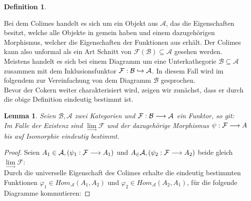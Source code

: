 \documentclass[10pt,a4paper]{report}
\newtheorem{lemma}[satz]{Lemma}
\newtheorem{definition}[satz]{Definition}
\newcommand{\functionfront}[3]{\nolinebreak{#1:#2 \longrightarrow #3}}
\newcommand{\colimes}[0]{\lim\limits_{ \longrightarrow }}
\newcommand{\infunctionfront}[3]{\nolinebreak{#1:#2 \hookrightarrow #3}}
\begin{document}
{\begin{definition}
\begin{itemize}
\end{itemize}
\end{definition}
Bei dem Colimes handelt es sich um ein Objekt aus $\mathcal{A}$, das die Eigenschaften besitzt, welche alle Objekte in  gemein haben und einem dazugehörigen Morphismus, welcher die Eigenschaften der Funktionen aus  erhält. Der Colimes kann also unformal als ein Art Schnitt von $\mathcal{F}(\mathcal{B}) \subseteq \mathcal{A}$ gesehen werden.\\
Meistens handelt es sich bei einem Diagramm um eine Unterkathegorie $\mathcal{B} \subseteq \mathcal{A}$ zusammen mit dem Inklusionsfunktor $\infunctionfront{\mathcal{F}}{\mathcal{B}}{\mathcal{A}}$. In diesem Fall wird im folgendem zur Vereinfachung von dem Diagramm $\mathcal{B}$ gesprochen.\\
Bevor der Cokern weiter charakterisiert wird, zeigen wir zunächst, dass er durch die obige Definition eindeutig bestimmt ist.
\begin{lemma}
Seien $\mathcal{B},\mathcal{A}$ zwei Kategorien und $\functionfront{\mathcal{F}}{\mathcal{B}}{\mathcal{A}}$ ein Funktor, so git:\\ 
Im Falle der Existenz sind $\colimes \mathcal{F}$ und der dazugehörige Morphismus $\functionfront{\psi}{\mathcal{F}}{A}$ bis auf Isomorphie eindeutig bestimmt.
\end{lemma}
\begin{proof}
Seien $A_1 \in \mathcal{A}, (\functionfront{\psi_1}{\mathcal{F}}{A_1}) $ und $A_ \in \mathcal{A} , (\functionfront{\psi_2}{\mathcal{F}}{A_2}) $ beide gleich $\colimes \mathcal{F}$:\\
Durch die universelle Eigenschaft des Colimes erhalte die eindeutig bestimmten Funktionen $\varphi_1 \in Hom_{\mathcal{A}}(A_1,A_2)$ und $\varphi_2 \in Hom_{\mathcal{A}}(A_2,A_1)$, für die folgende Diagramme kommutieren:


\end{proof}}
\end{document}
